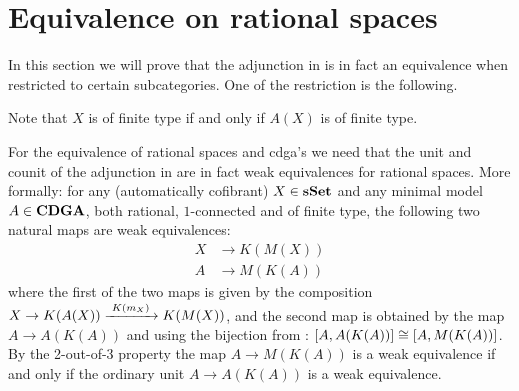 \section{Equivalence on rational spaces}
In this section we will prove that the adjunction in  is in fact an equivalence when restricted to certain subcategories. One of the restriction is the following.


Note that $X$ is of finite type if and only if $A(X)$ is of finite type.

For the equivalence of rational spaces and cdga's we need that the unit and counit of the adjunction in  are in fact weak equivalences for rational spaces. More formally: for any (automatically cofibrant) $X \in \mathbf{s{\mathbf{Set}}}$ and any minimal model $A \in \mathbf{CDGA}$, both rational, $1$-connected and of finite type, the following two natural maps are weak equivalences:
\begin{align*}
	X &\to K(M(X)) \\
	A &\to M(K(A))
\end{align*}
where the first of the two maps is given by the composition $X \to K(A(X)) \xrightarrow{\,\,{K(m_X)}\,\,} K(M(X))$,
and the second map is obtained by the map $A \to A(K(A))$ and using the bijection from : $[A, A(K(A))] \cong [A, M(K(A))]$. By the 2-out-of-3 property the map $A \to M(K(A))$ is a weak equivalence if and only if the ordinary unit $A \to A(K(A))$ is a weak equivalence.


